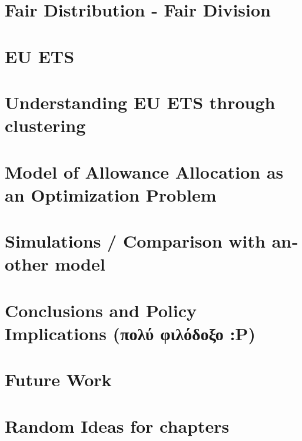 \documentclass[diploma]{softlab-thesis}
\begin{document}
\begin{english}
\chapter{Fair Distribution - Fair Division}

\chapter{EU ETS}

\chapter{Understanding EU ETS through clustering}

\chapter{Model of Allowance Allocation as an Optimization Problem}

\chapter{Simulations / Comparison with another model}

\chapter{Conclusions and Policy Implications (πολύ φιλόδοξο :Ρ)}

\chapter{Future Work}

\chapter{Random Ideas for chapters}





\end{english}
\end{document}
